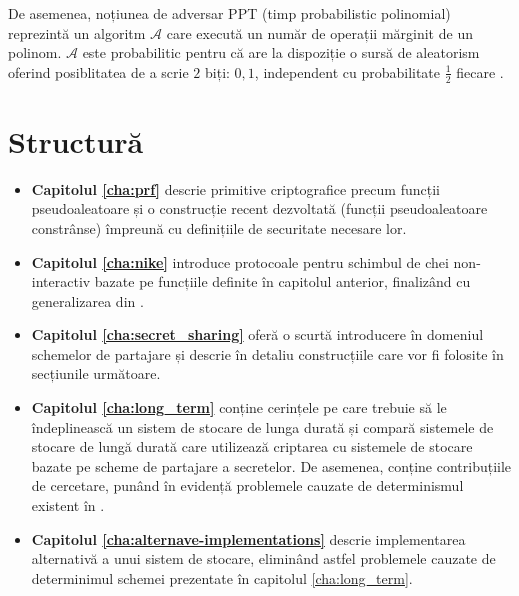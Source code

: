 \documentclass[oneside, 12pt]{book}
\begin{document}
De asemenea, noțiunea de adversar PPT (timp probabilistic polinomial) reprezintă un algoritm $\mathcal{A}$ care execută un număr de operații mărginit de un polinom. $\mathcal{A}$ este probabilitic pentru că are la dispoziție o sursă de aleatorism oferind posiblitatea de a scrie $2$ biți: $0,1$, independent cu probabilitate $\frac{1}{2}$ fiecare \cite{Katz:2007}.




\chapter*{Structură}

\begin{itemize}
	\item \textbf{Capitolul \ref{cha:prf}} descrie primitive criptografice precum funcții pseudoaleatoare și o construcție recent dezvoltată (funcții pseudoaleatoare constrânse) împreună cu definițiile de securitate necesare lor.
	\item \textbf{Capitolul \ref{cha:nike}} introduce protocoale pentru schimbul de chei non-interactiv bazate pe funcțiile definite în capitolul anterior, finalizând cu generalizarea din \cite{RD:2014}.
	\item \textbf{Capitolul \ref{cha:secret_sharing}} oferă o scurtă introducere în domeniul schemelor de partajare și descrie în detaliu construcțiile care vor fi folosite în secțiunile următoare.
	\item \textbf{Capitolul \ref{cha:long_term}} conține cerințele pe care trebuie să le îndeplinească un sistem de stocare de lunga durată și compară sistemele de stocare de lungă durată care utilizează criptarea cu sistemele de stocare bazate pe scheme de partajare a secretelor. De asemenea, conține contribuțiile de cercetare, punând în evidență problemele cauzate de determinismul existent în \cite{AAMK:2013}.
	\item \textbf{Capitolul \ref{cha:alternave-implementations}} descrie implementarea alternativă a unui sistem de stocare, eliminând astfel problemele cauzate de determinimul schemei prezentate în capitolul \ref{cha:long_term}.
\end{itemize}
\end{document}
